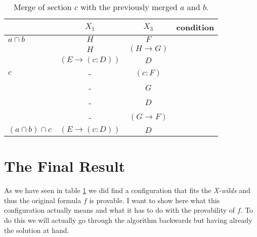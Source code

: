 \begin{table}[H]
\centering
\begin{tabular}{l c c r}
		& $X_1$ & $X_3$ & condition \\
	\hline
	$a \cap b$	& $H$ & $F$ & \\
		& $H$ & $(H \rightarrow G)$ & \\
		& $(E \rightarrow (c:D))$ & $D$ & \\
	\hline
	$c$	& - & $(c:F)$ & \\
		& - & $G$ & \\
		& - & $D$ & \\
		& - & $(G \rightarrow F)$ &\\
	\hline
	\hline
	$(a \cap b) \cap c$ & $(E \rightarrow (c:D))$ & $D$ \\
	\hline

\end{tabular}
\caption{Merge of section $c$ with the previously merged $a$ and $b$.}\label{merge_a_b_c}
\end{table}

\section{The Final Result}
As we have seen in table \ref{merge_a_b_c} we did find a configuration that fits the \emph{X-wilds} and thus the original formula $f$ is provable. I want to show here what this configuration actually means and what it has to do with the provability of $f$. To do this we will actually go through the algorithm backwards but having already the solution at hand.

